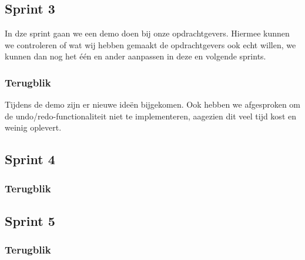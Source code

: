 \subsection{Sprint 3}
In dze sprint gaan we een demo doen bij onze opdrachtgevers. Hiermee kunnen we controleren of wat wij hebben gemaakt de opdrachtgevers ook echt willen, we kunnen dan nog het \'e\'en en ander aanpassen in deze en volgende sprints. 

\subsubsection*{Terugblik}
Tijdens de demo zijn er nieuwe ide\"en bijgekomen. Ook hebben we afgesproken om de undo/redo-functionaliteit niet te implementeren, aagezien dit veel tijd kost en weinig oplevert. 

\subsection{Sprint 4}

\subsubsection*{Terugblik}

\subsection{Sprint 5}

\subsubsection*{Terugblik}

